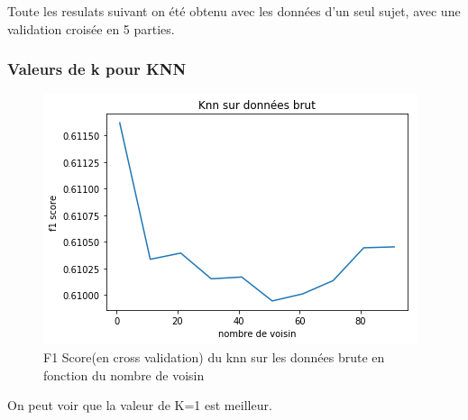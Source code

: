 \documentclass{article}[12pt]
\begin{document}
Toute les resulats suivant on été obtenu avec les données d'un seul sujet, avec une validation croisée en 5 parties.
\subsubsection{Valeurs de k pour KNN}

\begin{figure}[H]
\begin{center}
\includegraphics[scale=0.7]{images/f1_score_knn_brut.png}
\end{center}
\caption{F1 Score(en cross validation) du knn sur les données brute en fonction du nombre de voisin}
\end{figure}

On peut voir que la valeur de K=1 est meilleur.
\end{document}

